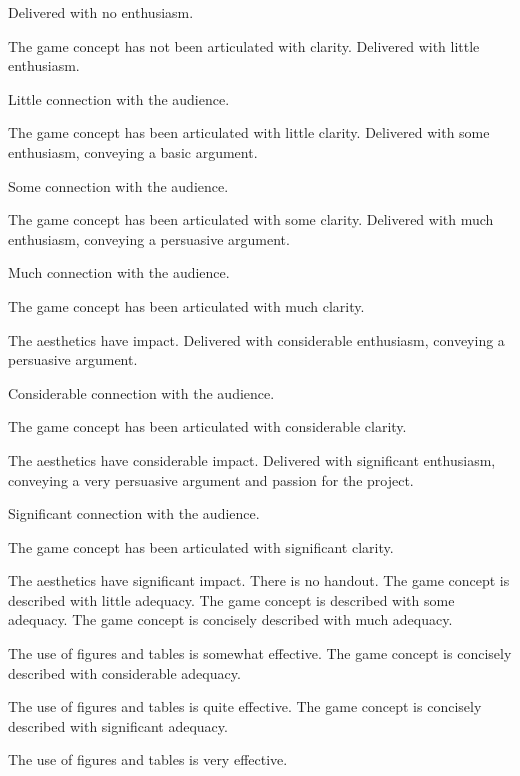 \documentclass{../fal_assignment}
\begin{document}
\begin{markingrubric}
%
        \grade\fail Delivered with no enthusiasm. 
           \par The game concept has not been articulated with clarity.
        \grade Delivered with little enthusiasm. 
            \par Little connection with the audience.
            \par The game concept has been articulated with little clarity.
        \grade Delivered with some enthusiasm, conveying a basic argument. 
            \par Some connection with the audience.
            \par The game concept has been articulated with some clarity.
        \grade Delivered with much enthusiasm, conveying a persuasive argument. 
            \par Much connection with the audience.
            \par The game concept has been articulated with much clarity.
            \par The aesthetics have impact.
        \grade Delivered with considerable enthusiasm, conveying a persuasive argument. 
            \par Considerable connection with the audience.
            \par The game concept has been articulated with considerable clarity.
            \par The aesthetics have considerable impact.
        \grade Delivered with significant enthusiasm, conveying a very persuasive argument and passion for the project.
            \par Significant connection with the audience.
            \par The game concept has been articulated with significant clarity.
            \par The aesthetics have significant impact.
%
        \grade\fail There is no handout. 
        \grade The game concept is described with little adequacy.
        \grade The game concept is described with some adequacy.
        \grade The game concept is concisely described with much adequacy.
            \par The use of figures and tables is somewhat effective.
        \grade The game concept is concisely described with considerable adequacy.
            \par The use of figures and tables is quite effective.
        \grade The game concept is concisely described with significant adequacy.
            \par The use of figures and tables is very effective.


\end{markingrubric}
\end{document}
